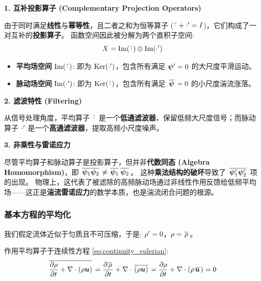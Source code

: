 \begin{insightbox}[平均算子与脉动算子的代数结构]
    \textbf{1. 互补投影算子 (Complementary Projection Operators)}

    由于同时满足\textbf{线性}与\textbf{幂等性}，且二者之和为恒等算子 ($\mkern2mu \overline{\cdot} \mkern2mu + \cdot' = I$)，它们构成了一对互补的\textbf{投影算子}。
    函数空间因此被分解为两个直积子空间:
    \begin{equation*}
        X = \text{Im}(\mkern2mu \overline{\cdot} \mkern2mu) \oplus \text{Im}(\cdot')
    \end{equation*}

    \begin{itemize}
        \item \textbf{平均场空间} $\text{Im}(\mkern2mu \overline{\cdot} \mkern2mu)$: 即为 $\text{Ker}(\cdot')$，包含所有满足 $\bm{\psi}'=0$ 的大尺度平滑运动。
        \item \textbf{脉动场空间} $\text{Im}(\cdot')$: 即为 $\text{Ker}(\mkern2mu \overline{\cdot} \mkern2mu)$，包含所有满足 $\mkern2mu \overline{\bm{\psi}} \mkern2mu=0$ 的小尺度湍流涨落。
    \end{itemize}

    \textbf{2. 滤波特性 (Filtering)}

    从信号处理角度，平均算子 $\mkern2mu \overline{\cdot} \mkern2mu$ 是一个\textbf{低通滤波器}，保留低频大尺度信号；而脉动算子 $\cdot'$ 是一个\textbf{高通滤波器}，提取高频小尺度噪声。

    \textbf{3. 非乘性与雷诺应力}

    尽管平均算子和脉动算子是投影算子，但并非\textbf{代数同态 (Algebra Homomorphism)}，即 $\mean{\wavefunc_1 \wavefunc_2} \neq \mean{\wavefunc_1} \mean{\wavefunc_2}$。
    这种\textbf{乘法结构的破坏}导致了 $\mkern2mu \overline{\bm{\psi}_1' \bm{\psi}_2'} \mkern2mu$ 项的出现。
    物理上，这代表了被滤除的高频脉动场通过非线性作用反馈给低频平均场——这正是\textbf{湍流雷诺应力}的数学本质，也是湍流闭合问题的根源。
\end{insightbox}

\subsubsection{基本方程的平均化}

我们假定流体近似于匀质且不可压缩，于是: $\rho' = 0$，$\rho = \mkern2mu \overline{\rho} \mkern2mu$。

作用平均算子于连续性方程 \eqref{eq:continuity_eulerian}:
\begin{equation*}
    \mean{\pde{\density}{\timevar} + \nabla \cdot (\density\vel)} = \pde{\mean{\density}}{\timevar} + \nabla \cdot \mean{(\density\vel)} = \pde{\density}{\timevar} + \nabla \cdot (\density\mean{\vel}) = 0
\end{equation*}

